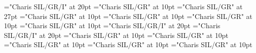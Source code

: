 \documentclass[a4paper]{article}
\begin{document}
\pagestyle{plain}
\sloppy
\setlength{\parfillskip}{0pt plus 1fil}
\font\pronunciationenUKpronunciationbefore="Charis SIL/GR/I" at 20pt
\font\sectionletterdictionary="Charis SIL/GR" at 10pt
\font\headsectionletterdictionary="Charis SIL/GR" at 27pt
\font\articledictionary="Charis SIL/GR" at 10pt
\font\headwordfirstoftypearticledictionary="Charis SIL/GR" at 10pt
\font\grammarrequiresfirstoftypearticledictionary="Charis SIL/GR" at 10pt
\font\relationsynonymfirstoftypearticledictionary="Charis SIL/GR" at 10pt
\font\pronunciationenUKarticledictionary="Charis SIL/GR/I" at 20pt
\font\pronunciationenUSarticledictionary="Charis SIL/GR/I" at 20pt
\font\grammarcategoryfirstoftypearticledictionary="Charis SIL/GR" at 10pt
\font{}="Charis SIL/GR" at 10pt
\font\notefirstoftypearticledictionary="Charis SIL/GR" at 10pt
\font\exampleusearticledictionary="Charis SIL/GR" at 10pt
\font\examplearticledictionary="Charis SIL/GR" at 10pt

\mbox{} 
\newpage 
\newpage 
\setcounter{page}{1} 
\pagestyle{fancy} 
\begin{center}
\end{center}

\pronunciationenUSarticledictionary{, }
\end{document}
